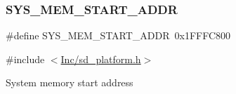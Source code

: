 \subsubsection{\texorpdfstring{S\+Y\+S\+\_\+\+M\+E\+M\+\_\+\+S\+T\+A\+R\+T\+\_\+\+A\+D\+DR}{SYS\_MEM\_START\_ADDR}}
{\footnotesize\ttfamily \#define S\+Y\+S\+\_\+\+M\+E\+M\+\_\+\+S\+T\+A\+R\+T\+\_\+\+A\+D\+DR~0x1\+F\+F\+F\+C800}



{\ttfamily \#include $<$\mbox{\hyperlink{sd__platform_8h}{Inc/sd\+\_\+platform.\+h}}$>$}

System memory start address 